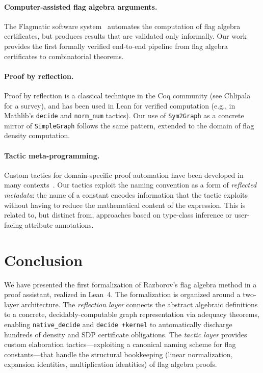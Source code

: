 \documentclass{article}
\newcommand{\lean}[1]{\texttt{#1}}
\begin{document}
\paragraph{Computer-assisted flag algebra arguments.}
The Flagmatic software system~\cite{razborov2010flagmatic} automates the
computation of flag algebra certificates, but produces results that are
validated only informally.  Our work provides the first formally verified
end-to-end pipeline from flag algebra certificates to combinatorial theorems.

\paragraph{Proof by reflection.}
Proof by reflection is a classical technique in the Coq community (see
Chlipala~\cite{chlipala2013cpdt} for a survey), and has been used in
Lean for verified computation (e.g., in Mathlib's \lean{decide} and
\lean{norm\_num} tactics).  Our use of \lean{Sym2Graph} as a concrete mirror
of \lean{SimpleGraph} follows the same pattern, extended to the domain of flag
density computation.

\paragraph{Tactic meta-programming.}
Custom tactics for domain-specific proof automation have been developed in many
contexts~\cite{ebner2017structured,sozeau2008coq}.  Our tactics exploit the
naming convention as a form of \emph{reflected metadata}: the name of a
constant encodes information that the tactic exploits without having to reduce
the mathematical content of the expression.  This is related to, but distinct
from, approaches based on type-class inference or user-facing attribute
annotations.

\section{Conclusion}
\label{sec:conclusion}

We have presented the first formalization of Razborov's flag algebra method in
a proof assistant, realized in Lean~4.  The formalization is organized around
a two-layer architecture.  The \emph{reflection layer} connects the abstract
algebraic definitions to a concrete, decidably-computable graph representation
via adequacy theorems, enabling \lean{native\_decide} and \lean{decide +kernel}
to automatically discharge hundreds of density and SDP certificate obligations.
The \emph{tactic layer} provides custom elaboration tactics---exploiting a
canonical naming scheme for flag constants---that handle the structural
bookkeeping (linear normalization, expansion identities, multiplication
identities) of flag algebra proofs.
\end{document}
